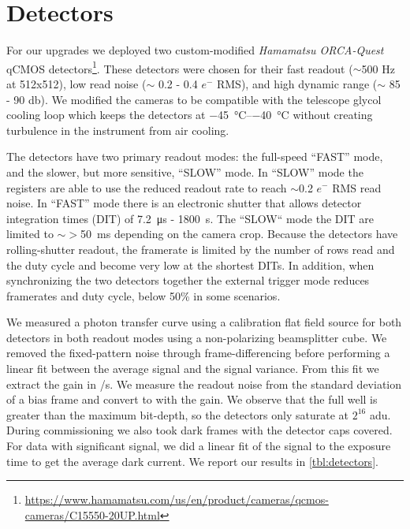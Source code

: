 \section{Detectors}\label{sec:detectors}

For our upgrades we deployed two custom-modified \textit{Hamamatsu ORCA-Quest} qCMOS detectors\footnote{\url{https://www.hamamatsu.com/us/en/product/cameras/qcmos-cameras/C15550-20UP.html}}. These detectors were chosen for their fast readout ($\sim$500 Hz at 512x512), low read noise ($\sim$ 0.2 - 0.4 $e^-$ RMS), and high dynamic range ($\sim$ 85 - 90 \si{\decibel}). We modified the cameras to be compatible with the telescope glycol cooling loop which keeps the detectors at \SIrange{-45}{-40}{\celsius} without creating turbulence in the instrument from air cooling.

The detectors have two primary readout modes: the full-speed ``FAST'' mode, and the slower, but more sensitive, ``SLOW'' mode. In ``SLOW'' mode the registers are able to use the reduced readout rate to reach $\sim$0.2 $e^-$ RMS read noise. In ``FAST'' mode there is an electronic shutter that allows detector integration times (DIT) of \SI{7.2}{\micro\second} - \SI{1800}{\second}. The ``SLOW`` mode the DIT are limited to $\sim >$\SI{50}{\milli\second} depending on the camera crop. Because the detectors have rolling-shutter readout, the framerate is limited by the number of rows read and the duty cycle and become very low at the shortest DITs. In addition, when synchronizing the two detectors together the external trigger mode reduces framerates and duty cycle, below 50\% in some scenarios.

We measured a photon transfer curve using a calibration flat field source for both detectors in both readout modes using a non-polarizing beamsplitter cube. We removed the fixed-pattern noise through frame-differencing before performing a linear fit between the average signal and the signal variance. From this fit we extract the gain in \si{\electron/\second}. We measure the readout noise from the standard deviation of a bias frame and convert to \si{\electron} with the gain. We observe that the full well is greater than the maximum bit-depth, so the detectors only saturate at $2^{16}$ \si{adu}. During commissioning we also took dark frames with the detector caps covered. For data with significant signal, we did a linear fit of the signal to the exposure time to get the average dark current. We report our results in \autoref{tbl:detectors}.


